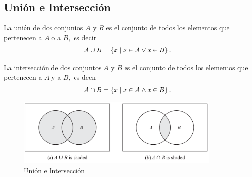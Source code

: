 \subsection{Unión e Intersección}


	La unión de dos conjuntos $A$ y $B$ es el conjunto de todos los elementos que pertenecen a $A$ o a $B,$  es decir
	$$
	A \cup B = \left\{ x \mid x\in A \vee x\in B \right\}.
	$$



	La intersección de dos conjuntos $A$ y $B$ es el conjunto de todos los elementos que pertenecen a $A$ y a $B,$  es decir
	$$
	A \cap B = \left\{ x \mid x\in A \wedge x\in B \right\}.
	$$



	\begin{figure}
		\centering
		\includegraphics[width=10cm,keepaspectratio=true]{./md/venn_union_interseccion.png}
		\caption{Unión e Intersección}
		\label{fig:0103}
	\end{figure}
	









